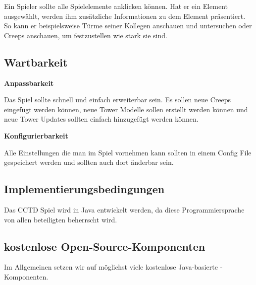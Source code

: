 Ein Spieler sollte alle Spielelemente anklicken können. Hat er ein Element ausgewählt, werden ihm zusätzliche Informationen zu dem Element präsentiert. So kann er beispielsweise Türme seiner Kollegen anschauen und untersuchen oder Creeps anschauen, um festzustellen wie stark sie sind.

%
%
%
\subsection{Wartbarkeit}

\textbf{Anpassbarkeit}

Das Spiel sollte schnell und einfach erweiterbar sein. Es sollen neue Creeps eingefügt werden können, neue Tower Modelle sollen erstellt werden können und neue Tower Updates sollten einfach hinzugefügt werden können.

\textbf{Konfigurierbarkeit}

Alle Einstellungen die man im Spiel vornehmen kann sollten in einem Config File gespeichert werden und sollten auch dort änderbar sein.
\subsection{Implementierungsbedingungen}
Das CCTD Spiel wird in Java entwickelt werden, da diese Programmiersprache von allen beteiligten beherrscht wird.
\subsection{kostenlose Open-Source-Komponenten}
Im Allgemeinen setzen wir auf möglichst viele kostenlose Java-basierte -Komponenten.

